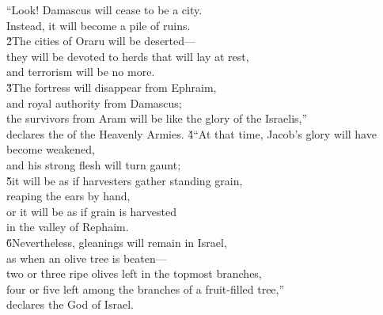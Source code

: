 \begin{poetry}
\poeml ``Look! Damascus will cease to be a city. \\
\poemll    Instead, it will become a pile of ruins. \\
\poeml \v{2}The cities of Oraru will be deserted--- \\
\poemll    they will be devoted to herds that will lay at rest, \\
\poemlll       and terrorism will be no more. \\
\poeml \v{3}The fortress will disappear from Ephraim, \\
\poemll    and royal authority from Damascus; \\
\poeml the survivors from Aram will be like the glory of the Israelis,'' \\
\poemll    declares the  of the Heavenly Armies.
\poeml \v{4}``At that time, Jacob's glory will have become weakened, \\
\poemll    and his strong flesh will turn gaunt; \\
\poeml \v{5}it will be as if harvesters gather standing grain, \\
\poemll    reaping the ears by hand, \\
\poeml or it will be as if grain is harvested \\
\poemll    in the valley of Rephaim. \\
\poeml \v{6}Nevertheless, gleanings will remain in Israel, \\
\poemll    as when an olive tree is beaten--- \\
\poeml two or three ripe olives left in the topmost branches, \\
\poemll    four or five left among the branches of a fruit-filled tree,'' \\
\poemlll       declares the  God of Israel.
\end{poetry}

